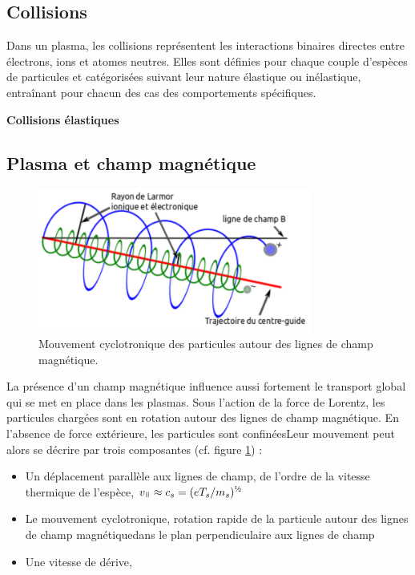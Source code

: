 		\subsection{Collisions}
			Dans un plasma, les collisions représentent les interactions binaires
			directes entre électrons, ions et atomes neutres. Elles sont
			définies pour chaque couple d'espèces de particules et catégorisées suivant
			leur nature élastique ou inélastique, entraînant pour chacun des cas des
			comportements spécifiques.
			
			\textbf{Collisions élastiques}
			
		\subsection{Plasma et champ magnétique}
			\begin{figure}
				\centering
				\includegraphics[width=0.8\textwidth]{figures/mouvementCyclotron.png}
				{\caption{Mouvement cyclotronique des particules autour des lignes de champ
				magnétique.}\label{1-particleDrifts}}
			\end{figure}
			La présence d'un champ magnétique influence aussi fortement le transport global qui 
			se met en place dans les plasmas. Sous l'action de la force de Lorentz, les particules 
			chargées sont en rotation autour des lignes de champ magnétique. En l'absence de force 
			extérieure, les particules sont confinéesLeur mouvement peut alors
			se décrire par trois composantes (cf. figure \ref{1-particleDrifts}) :			
			\begin{itemize}
			\item Un déplacement parallèle aux lignes de champ, de l'ordre de la vitesse
			thermique de l'espèce, $v_\para\approx c_s=(eT_s/m_s)^{\text{\textonehalf}}$
			\item Le mouvement cyclotronique, rotation rapide de la particule
			autour des lignes de champ magnétiquedans le plan perpendiculaire aux lignes
			de champ
			\item Une vitesse de dérive, 
			\end{itemize}
			\
			
